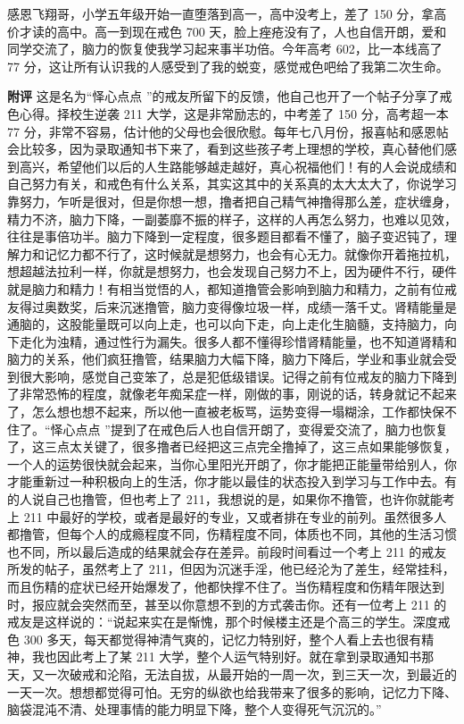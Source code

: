 \begin{case}
    感恩飞翔哥，小学五年级开始一直堕落到高一，高中没考上，差了 150 分，拿高价才读的高中。高一到现在戒色 700 天，脸上痤疮没有了，人也自信开朗，爱和同学交流了，脑力的恢复使我学习起来事半功倍。今年高考 602，比一本线高了 77 分，这让所有认识我的人感受到了我的蜕变，感觉戒色吧给了我第二次生命。

    \textbf{附评} 这是名为“怿心点点 ”的戒友所留下的反馈，他自己也开了一个帖子分享了戒色心得。择校生逆袭 211 大学，这是非常励志的，中考差了 150 分，高考超一本 77 分，非常不容易，估计他的父母也会很欣慰。每年七八月份，报喜帖和感恩帖会比较多，因为录取通知书下来了，看到这些孩子考上理想的学校，真心替他们感到高兴，希望他们以后的人生路能够越走越好，真心祝福他们！有的人会说成绩和自己努力有关，和戒色有什么关系，其实这其中的关系真的太大太大了，你说学习靠努力，乍听是很对，但是你想一想，撸者把自己精气神撸得那么差，症状缠身，精力不济，脑力下降，一副萎靡不振的样子，这样的人再怎么努力，也难以见效，往往是事倍功半。脑力下降到一定程度，很多题目都看不懂了，脑子变迟钝了，理解力和记忆力都不行了，这时候就是想努力，也会有心无力。就像你开着拖拉机，想超越法拉利一样，你就是想努力，也会发现自己努力不上，因为硬件不行，硬件就是脑力和精力！有相当觉悟的人，都知道撸管会影响到脑力和精力，之前有位戒友得过奥数奖，后来沉迷撸管，脑力变得像垃圾一样，成绩一落千丈。肾精能量是通脑的，这股能量既可以向上走，也可以向下走，向上走化生脑髓，支持脑力，向下走化为浊精，通过性行为漏失。很多人都不懂得珍惜肾精能量，也不知道肾精和脑力的关系，他们疯狂撸管，结果脑力大幅下降，脑力下降后，学业和事业就会受到很大影响，感觉自己变笨了，总是犯低级错误。记得之前有位戒友的脑力下降到了非常恐怖的程度，就像老年痴呆症一样，刚做的事，刚说的话，转身就记不起来了，怎么想也想不起来，所以他一直被老板骂，运势变得一塌糊涂，工作都快保不住了。“怿心点点 ”提到了在戒色后人也自信开朗了，变得爱交流了，脑力也恢复了，这三点太关键了，很多撸者已经把这三点完全撸掉了，这三点如果能够恢复，一个人的运势很快就会起来，当你心里阳光开朗了，你才能把正能量带给别人，你才能重新过一种积极向上的生活，你才能以最佳的状态投入到学习与工作中去。有的人说自己也撸管，但也考上了 211，我想说的是，如果你不撸管，也许你就能考上 211 中最好的学校，或者是最好的专业，又或者排在专业的前列。虽然很多人都撸管，但每个人的成瘾程度不同，伤精程度不同，体质也不同，其他的生活习惯也不同，所以最后造成的结果就会存在差异。前段时间看过一个考上 211 的戒友所发的帖子，虽然考上了 211，但因为沉迷手淫，他已经沦为了差生，经常挂科，而且伤精的症状已经开始爆发了，他都快撑不住了。当伤精程度和伤精年限达到时，报应就会突然而至，甚至以你意想不到的方式袭击你。还有一位考上 211 的戒友是这样说的：“说起来实在是惭愧，那个时候楼主还是个高三的学生。深度戒色 300 多天，每天都觉得神清气爽的，记忆力特别好，整个人看上去也很有精神，我也因此考上了某 211 大学，整个人运气特别好。就在拿到录取通知书那天，又一次破戒和沦陷，无法自拔，从最开始的一周一次，到三天一次，到最近的一天一次。想想都觉得可怕。无穷的纵欲也给我带来了很多的影响，记忆力下降、脑袋混沌不清、处理事情的能力明显下降，整个人变得死气沉沉的。”
\end{case}

